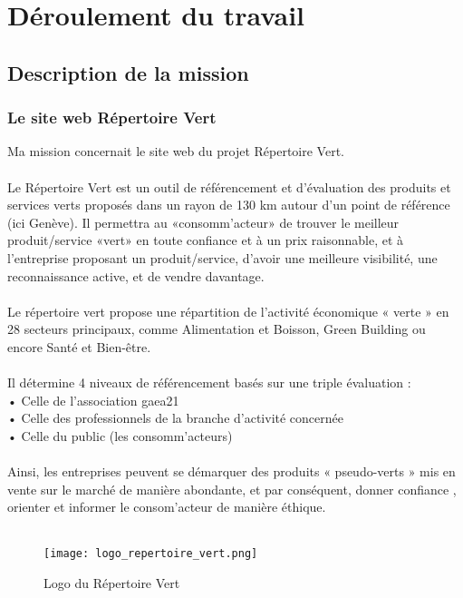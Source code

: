 \section{Déroulement du travail}


\subsection{Description de la mission}
\subsubsection{Le site web Répertoire Vert}

Ma mission concernait le site web du projet Répertoire Vert.
\\\\
Le Répertoire Vert est un outil de référencement et d’évaluation des produits et services verts proposés dans un rayon de 130 km autour d’un point de référence (ici Genève). 
Il permettra au «consomm’acteur» de trouver le meilleur produit/service «vert» en toute confiance et à un prix raisonnable, 
et à l’entreprise proposant un produit/service, d’avoir une meilleure visibilité, une reconnaissance active, et de vendre davantage.
\\\\

Le répertoire vert propose une répartition de l’activité économique « verte » en 28
secteurs principaux, comme Alimentation et Boisson, Green Building ou encore Santé et Bien-être.
\\\\
Il détermine 4 niveaux de référencement basés sur une triple évaluation :\\
• Celle de l’association gaea21\\
• Celle des professionnels de la branche d’activité concernée\\
• Celle du public (les consomm’acteurs)\\
\\
Ainsi, les entreprises peuvent se démarquer des produits « pseudo-verts » mis en vente sur le marché de manière abondante, et par conséquent, donner confiance , orienter et informer le consom’acteur de manière éthique.
\\\\

\begin{figure}[H]
    \centering
    \texttt{[image: logo\_repertoire\_vert.png]}
    \caption{Logo du Répertoire Vert}
\end{figure}

